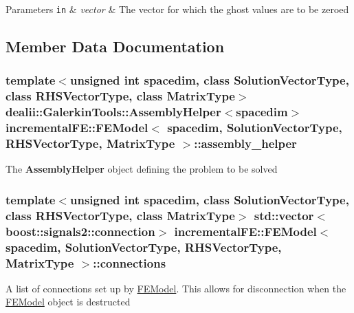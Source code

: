\begin{DoxyParams}[1]{Parameters}
\mbox{\tt in}  & {\em vector} & The vector for which the ghost values are to be zeroed \\
\hline
\end{DoxyParams}


\subsection{Member Data Documentation}
\subsubsection[{\texorpdfstring{assembly\+\_\+helper}{assembly_helper}}]{\setlength{\rightskip}{0pt plus 5cm}template$<$unsigned int spacedim, class Solution\+Vector\+Type, class R\+H\+S\+Vector\+Type, class Matrix\+Type$>$ dealii\+::\+Galerkin\+Tools\+::\+Assembly\+Helper$<$spacedim$>$ {\bf incremental\+F\+E\+::\+F\+E\+Model}$<$ spacedim, Solution\+Vector\+Type, R\+H\+S\+Vector\+Type, Matrix\+Type $>$\+::assembly\+\_\+helper\hspace{0.3cm}{\ttfamily [private]}}\hypertarget{classincremental_f_e_1_1_f_e_model_a937ea806f50796c76a45f36e6ec3cd29}{}\label{classincremental_f_e_1_1_f_e_model_a937ea806f50796c76a45f36e6ec3cd29}
The {\bf Assembly\+Helper} object defining the problem to be solved 
\subsubsection[{\texorpdfstring{connections}{connections}}]{\setlength{\rightskip}{0pt plus 5cm}template$<$unsigned int spacedim, class Solution\+Vector\+Type, class R\+H\+S\+Vector\+Type, class Matrix\+Type$>$ std\+::vector$<$boost\+::signals2\+::connection$>$ {\bf incremental\+F\+E\+::\+F\+E\+Model}$<$ spacedim, Solution\+Vector\+Type, R\+H\+S\+Vector\+Type, Matrix\+Type $>$\+::connections\hspace{0.3cm}{\ttfamily [private]}}\hypertarget{classincremental_f_e_1_1_f_e_model_acf28a249a6d3800401624fc8bc8f3baf}{}\label{classincremental_f_e_1_1_f_e_model_acf28a249a6d3800401624fc8bc8f3baf}
A list of connections set up by \hyperlink{classincremental_f_e_1_1_f_e_model}{F\+E\+Model}. This allows for disconnection when the \hyperlink{classincremental_f_e_1_1_f_e_model}{F\+E\+Model} object is destructed 
